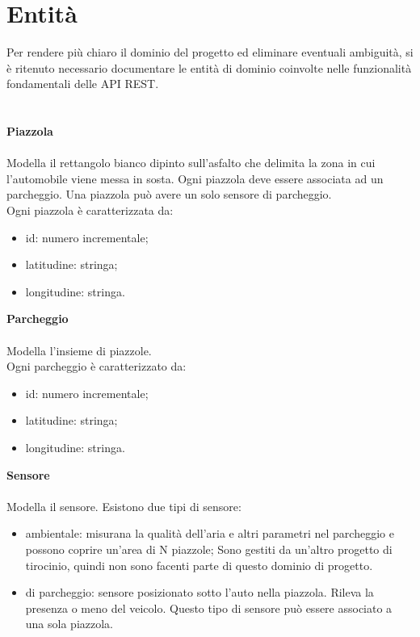 \section{Entità}
Per rendere più chiaro il dominio del progetto ed eliminare eventuali ambiguità, si è ritenuto necessario
documentare le entità di dominio coinvolte nelle funzionalità fondamentali delle \gls{API} \gls{REST}.
\\\\\\
\textbf{Piazzola}
\\\\
Modella il rettangolo bianco dipinto sull'asfalto che delimita la zona in cui l'automobile viene messa
in sosta. Ogni piazzola deve essere associata ad un parcheggio. Una piazzola può avere un solo sensore
di parcheggio.
\\
Ogni piazzola è caratterizzata da:
\begin{itemize}
    \item id: numero incrementale;
    \item latitudine: stringa;
    \item longitudine: stringa.
\end{itemize}
\leavevmode\newline
\textbf{Parcheggio}
\\\\
Modella l'insieme di piazzole.
\\
Ogni parcheggio è caratterizzato da:
\begin{itemize}
    \item id: numero incrementale;
    \item latitudine: stringa;
    \item longitudine: stringa.
\end{itemize}
\leavevmode\newline
\textbf{Sensore}
\\\\
Modella il sensore. Esistono due tipi di sensore:
\begin{itemize}
    \item ambientale: misurana la qualità dell'aria e altri parametri nel parcheggio e possono 
        coprire un'area di N piazzole;
        Sono gestiti da un'altro progetto di tirocinio, quindi non sono facenti parte di questo dominio di progetto.
    \item di parcheggio: sensore posizionato sotto l'auto nella piazzola. Rileva la presenza o meno
        del veicolo. Questo tipo di sensore può essere associato a una sola piazzola.
\end{itemize}
